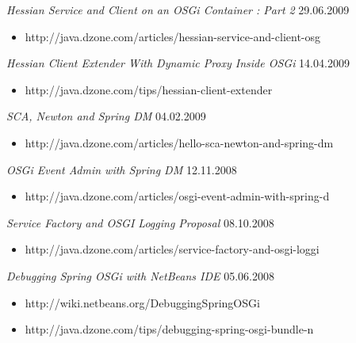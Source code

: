 \documentclass{res}
\begin{document}
\begin{resume}
{\sl Hessian Service and Client on an OSGi Container : Part 2}  \hfill   29.06.2009	\\
\vspace{-5mm}  \begin{itemize}
\item[]  \scriptsize http://java.dzone.com/articles/hessian-service-and-client-osg
\end{itemize}
\vspace{-2mm}

{\sl Hessian Client Extender With Dynamic Proxy Inside OSGi}  \hfill   14.04.2009	\\
\vspace{-5mm}  \begin{itemize}
\item[]  \scriptsize http://java.dzone.com/tips/hessian-client-extender
\end{itemize}
\vspace{-2mm}

{\sl SCA, Newton and Spring DM}  \hfill    04.02.2009	\\
\vspace{-5mm}  \begin{itemize}
\item[]  \scriptsize http://java.dzone.com/articles/hello-sca-newton-and-spring-dm
\end{itemize}
\vspace{-2mm}

{\sl OSGi Event Admin with Spring DM}  \hfill   12.11.2008 \\
\vspace{-5mm}  \begin{itemize}
\item[]  \scriptsize http://java.dzone.com/articles/osgi-event-admin-with-spring-d
\end{itemize}
\vspace{-2mm}

{\sl Service Factory and OSGI Logging Proposal}  \hfill   08.10.2008	\\
\vspace{-5mm}  \begin{itemize}
\item[]  \scriptsize http://java.dzone.com/articles/service-factory-and-osgi-loggi
\end{itemize}
\vspace{-2mm}

{\sl Debugging Spring OSGi with NetBeans IDE}  \hfill   05.06.2008	\\
\vspace{-5mm}  \begin{itemize}
\item[]  \scriptsize http://wiki.netbeans.org/DebuggingSpringOSGi
\vspace{-2mm}
\item[]  \scriptsize http://java.dzone.com/tips/debugging-spring-osgi-bundle-n
\end{itemize}
\vspace{-2mm}


\end{resume}
\end{document}
